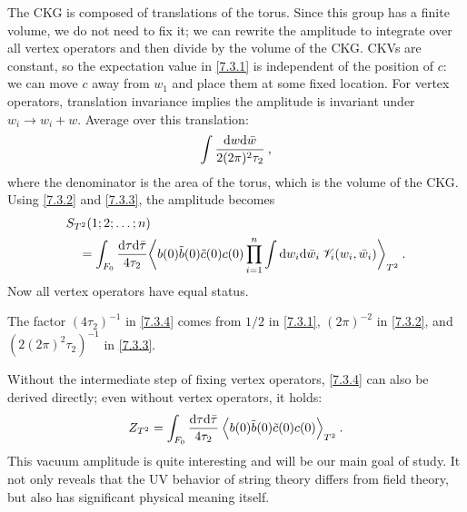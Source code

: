 The CKG is composed of translations of the torus. Since this group has a finite volume, we do not need to fix it; we can rewrite the amplitude to integrate over all vertex operators and then divide by the volume of the CKG. CKVs are constant, so the expectation value in \eqref{7.3.1} is independent of the position of $c$: we can move $c$ away from $w_{1}$ and place them at some fixed location. For vertex operators, translation invariance implies the amplitude is invariant under $w_{i} \rightarrow w_{i}+w$. 
Average over this translation: 
\begin{equation}
	\int \frac{\mathrm{d} w \mathrm{d} \bar{w}}{2(2 \pi)^{2} \tau_{2}} \:, \label{7.3.3} 
\end{equation}
where the denominator is the area of the torus, which is the volume of the CKG. 
Using \eqref{7.3.2} and \eqref{7.3.3}, the amplitude becomes 
\begin{align}
	&S_{T^{2}}(1 ; 2 ; \ldots ; n) \nonumber \\
	&\quad=\int_{F_{0}} \frac{\mathrm{d} \tau \mathrm{d} \bar{\tau}}{4 \tau_{2}} 
	\biggl\langle b(0) \tilde{b}(0) \tilde{c}(0) c(0) \prod_{i=1}^{n} \int \mathrm{d} w_{i} \mathrm{d} \bar{w}_{i}\: 
	\mathscr{V}_{i}(w_{i}, \bar{w}_{i})\biggr\rangle_{T^{2}} \:. \label{7.3.4} 
\end{align}
Now all vertex operators have equal status. 
\begin{tcolorbox}
	\begin{remark}
		The factor $(4\tau_{2})^{-1}$ in \eqref{7.3.4} comes from $1/2$ in \eqref{7.3.1}, $(2\pi)^{-2}$ in \eqref{7.3.2}, and $(2(2\pi )^2 \tau _2 )^{-1}$ in \eqref{7.3.3}.
	\end{remark}
\end{tcolorbox}

Without the intermediate step of fixing vertex operators, \eqref{7.3.4} can also be derived directly; even without vertex operators, it holds: 
\begin{equation}
	Z_{T^{2}}=\int_{F_{0}} \frac{\mathrm{d} \tau \mathrm{d} \bar{\tau}}{4 \tau_{2}} \:
	\Bigl\langle b(0) \tilde{b}(0) \tilde{c}(0) c(0)\Bigr\rangle_{T^{2}} \:. \label{7.3.5} 
\end{equation}
This vacuum amplitude is quite interesting and will be our main goal of study. It not only reveals that the UV behavior of string theory differs from field theory, but also has significant physical meaning itself. 

